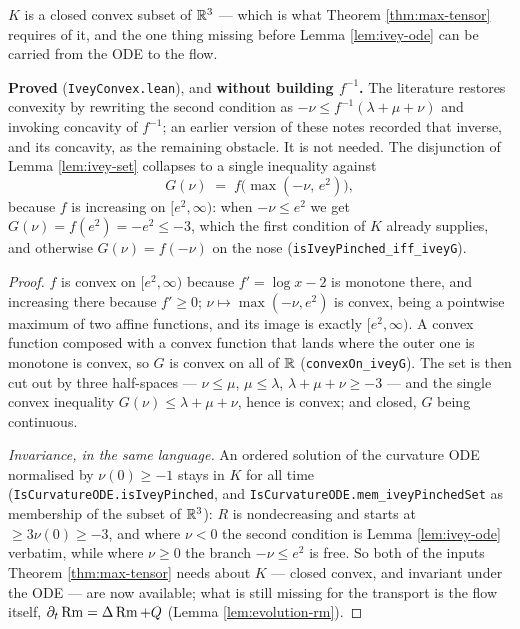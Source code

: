 \begin{lemma}
  \label{lem:ivey-convex}
  \leanok
  $K$ is a closed convex subset of $\mathbb{R}^3$ --- which is what
  Theorem \ref{thm:max-tensor} requires of it, and the one thing missing before
  Lemma \ref{lem:ivey-ode} can be carried from the ODE to the flow.

  \textbf{Proved} (\texttt{IveyConvex.lean}), and \textbf{without building
  $f^{-1}$.} The literature restores convexity by rewriting the second condition
  as $-\nu \le f^{-1}(\lambda+\mu+\nu)$ and invoking concavity of $f^{-1}$; an
  earlier version of these notes recorded that inverse, and its concavity, as
  the remaining obstacle. It is not needed. The disjunction of
  Lemma \ref{lem:ivey-set} collapses to a single inequality against
  \[
    G(\nu) \;=\; f\bigl(\max(-\nu,\, e^2)\bigr),
  \]
  because $f$ is increasing on $[e^2,\infty)$: when $-\nu \le e^2$ we get
  $G(\nu) = f(e^2) = -e^2 \le -3$, which the first condition of $K$ already
  supplies, and otherwise $G(\nu) = f(-\nu)$ on the nose
  (\texttt{isIveyPinched\_iff\_iveyG}).
\end{lemma}

\begin{proof}
  \leanok
  $f$ is convex on $[e^2,\infty)$ because $f' = \log x - 2$ is monotone there,
  and increasing there because $f' \ge 0$; $\nu \mapsto \max(-\nu, e^2)$ is
  convex, being a pointwise maximum of two affine functions, and its image is
  exactly $[e^2,\infty)$. A convex function composed with a convex function that
  lands where the outer one is monotone is convex, so $G$ is convex on all of
  $\mathbb{R}$ (\texttt{convexOn\_iveyG}). The set is then cut out by three half-spaces
  --- $\nu \le \mu$, $\mu \le \lambda$, $\lambda+\mu+\nu \ge -3$ --- and the
  single convex inequality $G(\nu) \le \lambda+\mu+\nu$, hence is convex; and
  closed, $G$ being continuous.

  \emph{Invariance, in the same language.} An ordered solution of the curvature
  ODE normalised by $\nu(0) \ge -1$ stays in $K$ for all time
  (\texttt{IsCurvatureODE.isIveyPinched}, and
  \texttt{IsCurvatureODE.mem\_iveyPinchedSet} as membership of the subset of
  $\mathbb{R}^3$): $R$ is nondecreasing and starts at $\ge 3\nu(0) \ge -3$, and where
  $\nu < 0$ the second condition is Lemma \ref{lem:ivey-ode} verbatim, while
  where $\nu \ge 0$ the branch $-\nu \le e^2$ is free. So both of the inputs
  Theorem \ref{thm:max-tensor} needs about $K$ --- closed convex, and invariant
  under the ODE --- are now available; what is still missing for the transport
  is the flow itself, $\partial_t \operatorname{Rm} = \Delta \operatorname{Rm} + Q$
  (Lemma \ref{lem:evolution-rm}).
\end{proof}

